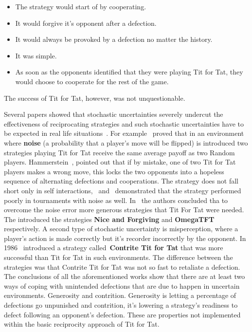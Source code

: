 \documentclass{article}
\theoremstyle{definition}
\begin{document}
\begin{itemize}
    \item The strategy would start of by cooperating.
    \item It would forgive it's opponent after a defection.
    \item It would always be provoked by a defection no matter the history.
    \item It was simple.
    \item As soon as the opponents identified that they were playing Tit for Tat,
    they would choose to cooperate for the rest of the game.
\end{itemize}

The success of Tit for Tat, however, was not unquestionable.

Several papers showed that stochastic uncertainties severely undercut the
effectiveness of reciprocating strategies and such stochastic uncertainties have
to be expected in real life situations~\cite{Milinski1987}. For
example~\cite{Molander1985} proved that in an environment where \textbf{noise}
(a probability that a player's move will be flipped) is introduced two
strategies playing Tit for Tat receive the same average payoff as two Random
players. Hammerstein~\cite{Hammerstein1984}, pointed out that if by mistake, one
of two Tit for Tat players makes a wrong move, this locks the two opponents into
a hopeless sequence of alternating defections and cooperations. The strategy
does not fall short only in self interactions,~\cite{Bendor1991}
and~\cite{Donninger1986} demonstrated that the strategy performed poorly in
tournaments with noise as well. In~\cite{Bendor1991, Wolfgang2006} the authors
concluded tha to overcome the noise error more generous strategies that Tit For
Tat were needed. The introduced the strategies \textbf{Nice and Forgiving} and
\textbf{OmegaTFT} respectively. A second type of stochastic uncertainty is
misperception, where a player's action is made correctly but it's recorder
incorrectly by the opponent. In 1986~\cite{Wu1995} introduced a strategy
called~\textbf{Contrite Tit for Tat} that was more successful than Tit for Tat
in such environments. The difference between the strategies was that Contrite
Tit for Tat was not so fast to retaliate a defection. The conclusions of all the
aforementioned works show that there are at least two ways of coping with
unintended defections that are due to happen in uncertain environments.
Generosity and contrition. Generosity is letting a percentage of defections go
unpunished and contrition, it's lowering a strategy's readiness to defect
following an opponent's defection. These are properties not implemented within
the basic reciprocity approach of Tit for Tat.
\end{document}

